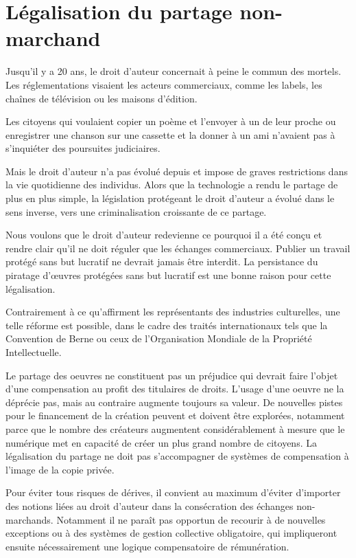 \chapter{Légalisation du partage non-marchand}\label{depen}

Jusqu’il y a 20 ans, le droit d’auteur concernait à peine le commun des mortels. Les réglementations visaient les acteurs commerciaux, comme les labels, les chaînes de télévision ou les maisons d’édition.

Les citoyens qui voulaient copier un poème et l’envoyer à un de leur proche ou enregistrer une chanson
sur une cassette et la donner à un ami n’avaient pas à s’inquiéter des poursuites judiciaires.

Mais le droit d'auteur n'a pas évolué depuis et impose de graves restrictions dans
la vie quotidienne des individus. Alors que la technologie a rendu le partage de plus en plus
simple, la législation protégeant le droit d'auteur a évolué dans le sens inverse, vers une criminalisation croissante de ce
partage.

\begin{mesure}
 Nous voulons que le droit d’auteur redevienne ce pourquoi il a été conçu et rendre clair qu’il ne
doit réguler que les échanges commerciaux. Publier un travail protégé sans but lucratif
ne devrait jamais être interdit. La persistance du piratage d'œuvres protégées sans but lucratif est une bonne raison pour cette
légalisation.
\end{mesure}

Contrairement à ce qu'affirment les représentants des industries culturelles, une telle réforme est possible, dans le cadre des traités internationaux tels que la Convention de Berne ou ceux de l’Organisation Mondiale de la Propriété Intellectuelle.

Le partage des oeuvres ne constituent pas un préjudice qui devrait faire l'objet d'une compensation au profit des titulaires de droits. L'usage d'une oeuvre ne la déprécie pas, mais au contraire augmente toujours sa valeur. De nouvelles pistes pour le financement de la création peuvent et doivent être explorées, notamment parce que le nombre des créateurs augmentent considérablement à mesure que le numérique met en capacité de créer un plus grand nombre de citoyens. La légalisation du partage ne doit pas s'accompagner de systèmes de compensation à l'image de la copie privée. 

Pour éviter tous risques de dérives, il convient au maximum d'éviter d'importer des notions liées au droit d'auteur dans la consécration des échanges non-marchands. Notamment il ne paraît pas opportun de recourir à de nouvelles exceptions ou à des systèmes de gestion collective obligatoire, qui impliqueront ensuite nécessairement une logique compensatoire de rémunération. 

